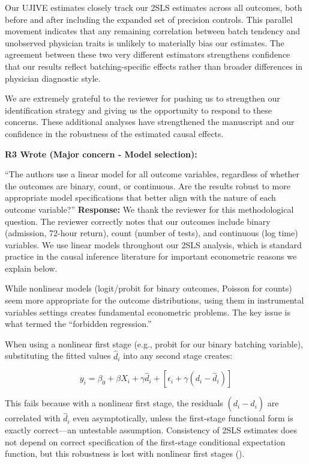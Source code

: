 \documentclass[11pt]{article}
\newenvironment{quote2}
{ \bigskip
\noindent
         \small\em
         \baselineskip=14pt
}
\newcommand{\1}{\hbox{\rm 1\kern-.35em 1}}
\begin{document}
Our UJIVE estimates closely track our 2SLS estimates across all outcomes, both before and after including the expanded set of precision controls. This parallel movement indicates that any remaining correlation between batch tendency and unobserved physician traits is unlikely to materially bias our estimates. The agreement between these two very different estimators strengthens confidence that our results reflect batching-specific effects rather than broader differences in physician diagnostic style.

We are extremely grateful to the reviewer for pushing us to strengthen our identification strategy and giving us the opportunity to respond to these concerns. These additional analyses have strengthened the manuscript and our confidence in the robustness of the estimated causal effects.
\color{black}


\begin{quote2}
\textbf{R3 Wrote (Major concern -  Model selection):}  

\noindent``The authors use a linear model for all outcome variables, regardless of whether the outcomes are binary, count, or continuous. Are the results robust to more appropriate model specifications that better align with the nature of each outcome variable?''
\end{quote2}

\noindent\textbf{Response:} \color{blue} We thank the reviewer for this methodological question. The reviewer correctly notes that our outcomes include binary (admission, 72-hour return), count (number of tests), and continuous (log time) variables. We use linear models throughout our 2SLS analysis, which is standard practice in the causal inference literature for important econometric reasons we explain below.

While nonlinear models (logit/probit for binary outcomes, Poisson for counts) seem more appropriate for the outcome distributions, using them in instrumental variables settings creates fundamental econometric problems. The key issue is what \cite{hausman1975, Hausman1978} termed the ``forbidden regression.''

When using a nonlinear first stage (e.g., probit for our binary batching variable), substituting the fitted values $\hat{d}_i$ into any second stage creates:

$$y_i = \beta_0 + \beta X_i + \gamma \hat{d}_i + [\epsilon_i + \gamma(d_i - \hat{d}_i)]$$

This fails because with a nonlinear first stage, the residuals $(d_i - \hat{d}_i)$ are correlated with $\hat{d}_i$ even asymptotically, unless the first-stage functional form is exactly correct—an untestable assumption. Consistency of 2SLS estimates does not depend on correct specification of the first-stage conditional expectation function, but this robustness is lost with nonlinear first stages (\cite{angrist2009mostly}).
\end{document}
